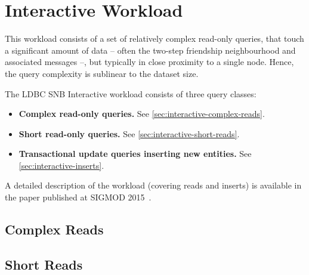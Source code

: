 \chapter{Interactive Workload}
\label{section:interactive}

This workload consists of a set of relatively complex read-only queries, that touch a significant
amount of data -- often the two-step friendship neighbourhood and associated messages --, but typically in close proximity to a single node. Hence, the query complexity is sublinear to the dataset size.

The LDBC SNB Interactive workload consists of three query classes:

\begin{itemize}
\item \textbf{Complex read-only queries.} See \autoref{sec:interactive-complex-reads}.
\item \textbf{Short read-only queries.} See \autoref{sec:interactive-short-reads}.
\item \textbf{Transactional update queries inserting new entities.} See \autoref{sec:interactive-inserts}.
\end{itemize}

A detailed description of the workload (covering reads and inserts) is available in the paper published at \mbox{SIGMOD} 2015~\cite{DBLP:conf/sigmod/ErlingALCGPPB15}.


\section{Complex Reads}
\label{sec:interactive-complex-reads}




\section{Short Reads}
\label{sec:interactive-short-reads}

